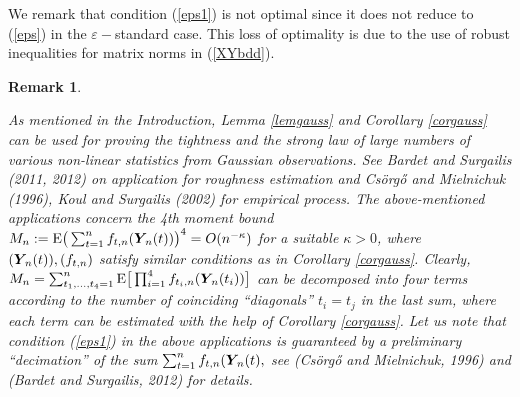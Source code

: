 \documentclass[10pt]{article}
\def\E{\mathrm E}
\newcommand{\mbf}[1]{\mbox{\boldmath $#1$}}
\newtheorem{rem}{Remark}
\begin{document}
We remark that condition (\ref{eps1}) is not optimal since it does not reduce to (\ref{eps}) in the $\varepsilon-$standard case.
This loss of optimality is due to the use of robust inequalities for matrix norms in (\ref{XYbdd}).


\begin{rem} \label{tight} {\rm As mentioned in the Introduction, Lemma \ref{lemgauss} and Corollary \ref{corgauss} can be used
for proving the tightness and the strong law of large numbers of various non-linear
statistics from Gaussian observations. See Bardet and Surgailis (2011, 2012) on application for
roughness estimation and Cs\"org{\H o} and Mielnichuk (1996), Koul and Surgailis (2002) for empirical process. The above-mentioned 
applications concern the 4th moment bound $M_{n} := \E \big(\sum_{t=1}^n f_{t,n}({\mbf Y}_{\! n}(t)) \big)^4 = O(n^{-\kappa})$
for a suitable $\kappa >0$, where $({\mbf Y}_{\! n}(t)), (f_{t,n})$ satisfy similar conditions as in
Corollary \ref{corgauss}. Clearly, $M_{n} = \sum_{t_1, \dots, t_4=1}^n   \E \big[\prod_{i=1}^4 f_{t_i,n}({\mbf Y}_{\! n}(t_i)) \big] $ can be decomposed into four terms according to the number of coinciding
``diagonals'' $t_i = t_j $ in the last sum, where each term can be estimated  with the help of Corollary \ref{corgauss}. 
Let us note that condition (\ref{eps1}) in the above applications is guaranteed by a preliminary ``decimation'' of the sum $\sum_{t=1}^n f_{t,n}({\mbf Y}_{\! n}(t),$ see 
(Cs\"org{\H o} and Mielnichuk, 1996) and (Bardet and Surgailis, 2012)  for details.



}
\end{rem}
\end{document}
